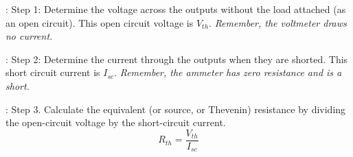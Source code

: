\documentclass[handout]{beamer}
\begin{document}
\begin{frame}{\secname : \subsecname}
    Step 1: Determine the voltage across the outputs without the load attached (as an open circuit).  This open circuit voltage is $V_{th}$. \emph{Remember, the voltmeter draws no current.}
    \begin{figure}
    \end{figure}
\end{frame}
\begin{frame}{\secname : \subsecname}
    Step 2: Determine the current through the outputs when they are shorted.  This short circuit current is $I_{sc}$. \emph{Remember, the ammeter has zero resistance and is a short.}
    \begin{figure}
    \end{figure}
\end{frame}
\begin{frame}{\secname : \subsecname}
    Step 3.  Calculate the equivalent (or source, or Thevenin) resistance by dividing the open-circuit voltage by the short-circuit current.
    \begin{equation}
        R_{th}=\dfrac{V_{th}}{I_{sc}}
    \end{equation}
    \begin{figure}
    \end{figure}
\end{frame}
\end{document}
